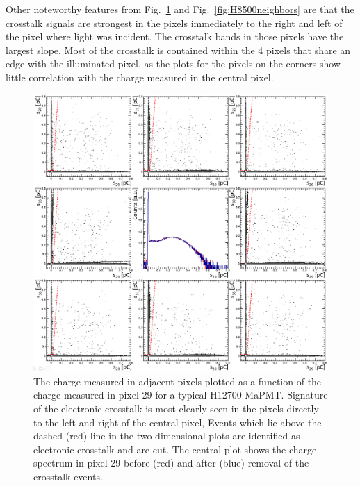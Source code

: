 Other noteworthy features from Fig.~\ref{fig:H12700neighbors} and Fig.~\ref{fig:H8500neighbors} are that the crosstalk signals are strongest in the pixels immediately to the right and left of the pixel where light was incident. The crosstalk bands in those pixels have the largest slope. Most of the crosstalk is contained within the 4 pixels that share an edge with the illuminated pixel, as the plots for the pixels on the corners show little correlation with the charge measured in the central pixel.

\begin{figure}[h!bt]
	\centering
	\includegraphics[width=0.9\linewidth]{figures/H12700_ct_v2.png}
	\caption{The charge measured in adjacent pixels plotted as a function of the charge measured in pixel 29 for a typical H12700 MaPMT. Signature of the electronic crosstalk is most clearly seen in the pixels directly to the left and right of the central pixel, Events which lie above the dashed (red) line in the two-dimensional plots are identified as electronic crosstalk and are cut. The central plot shows the charge spectrum in pixel 29 before (red) and after (blue) removal of the crosstalk events.}
	\label{fig:H12700neighbors}
\end{figure}
